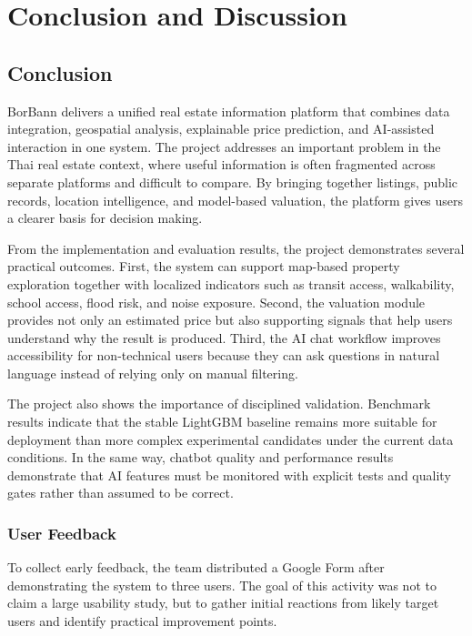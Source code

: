 \chapter{Conclusion and Discussion}

\section{Conclusion}

BorBann delivers a unified real estate information platform that combines data integration, geospatial analysis, explainable price prediction, and AI-assisted interaction in one system. The project addresses an important problem in the Thai real estate context, where useful information is often fragmented across separate platforms and difficult to compare. By bringing together listings, public records, location intelligence, and model-based valuation, the platform gives users a clearer basis for decision making.

From the implementation and evaluation results, the project demonstrates several practical outcomes. First, the system can support map-based property exploration together with localized indicators such as transit access, walkability, school access, flood risk, and noise exposure. Second, the valuation module provides not only an estimated price but also supporting signals that help users understand why the result is produced. Third, the AI chat workflow improves accessibility for non-technical users because they can ask questions in natural language instead of relying only on manual filtering.

The project also shows the importance of disciplined validation. Benchmark results indicate that the stable LightGBM baseline remains more suitable for deployment than more complex experimental candidates under the current data conditions. In the same way, chatbot quality and performance results demonstrate that AI features must be monitored with explicit tests and quality gates rather than assumed to be correct.

\subsection{User Feedback}
To collect early feedback, the team distributed a Google Form after demonstrating the system to three users. The goal of this activity was not to claim a large usability study, but to gather initial reactions from likely target users and identify practical improvement points.

